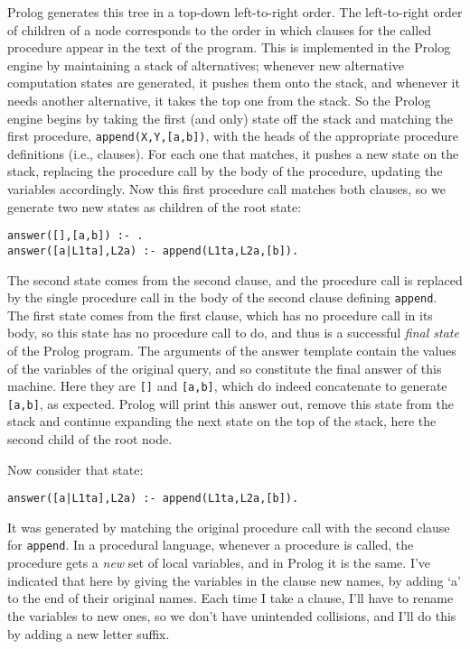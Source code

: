 Prolog generates this tree in a top-down left-to-right order.  The
left-to-right order of children of a node corresponds to the order in
which clauses for the called procedure appear in the text of the
program.  This is implemented in the Prolog engine by maintaining a
stack of alternatives; whenever new alternative computation states are
generated, it pushes them onto the stack, and whenever it needs
another alternative, it takes the top one from the stack.  So the
Prolog engine begins by taking the first (and only) state off the
stack and matching the first procedure, \verb|append(X,Y,[a,b])|, with
the heads of the appropriate procedure definitions (i.e., clauses).
For each one that matches, it pushes a new state on the stack,
replacing the procedure call by the body of the procedure, updating
the variables accordingly.  Now this first procedure call matches both
clauses, so we generate two new states as children of the root state:
\begin{verbatim}
answer([],[a,b]) :- .
answer([a|L1ta],L2a) :- append(L1ta,L2a,[b]).
\end{verbatim}
The second
state comes from the second clause, and the procedure call is replaced
by the single procedure call in the body of the second clause defining
\verb|append|.  The first state comes from the first clause, which has
no procedure call in its body, so this state has no procedure call to
do, and thus is a successful {\em final state} of the Prolog program.
The arguments of the answer template contain the values of the
variables of the original query, and so constitute the final answer of
this machine.  Here they are \verb|[]| and \verb|[a,b]|, which do
indeed concatenate to generate \verb|[a,b]|, as expected.  Prolog will
print this answer out, remove this state from the stack and continue
expanding the next state on the top of the stack, here the second
child of the root node.

Now consider that state:
\begin{verbatim}
answer([a|L1ta],L2a) :- append(L1ta,L2a,[b]).
\end{verbatim}
It was generated by matching the original procedure call with the
second clause for \verb|append|.  In a procedural language, whenever a
procedure is called, the procedure gets a {\em new} set of local
variables, and in Prolog it is the same.  I've indicated that here by
giving the variables in the clause new names, by adding `a' to the end
of their original names.  Each time I take a clause, I'll have to
rename the variables to new ones, so we don't have unintended
collisions, and I'll do this by adding a new letter suffix.


